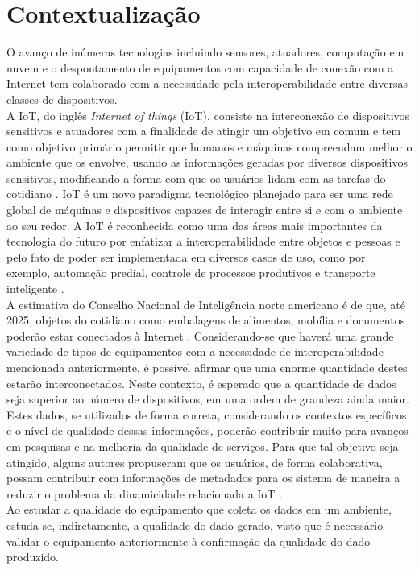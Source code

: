 \section{Contextualização}
\qquad
O avanço de inúmeras tecnologias incluindo sensores, atuadores, computação em nuvem e o despontamento de equipamentos com capacidade de conexão com a Internet tem colaborado com a necessidade pela interoperabilidade entre diversas classes de dispositivos.
\\ \null
\qquad
A \acrlong{IoT}, do inglês \textit{Internet of things} (\acrshort{IoT}), consiste na interconexão de dispositivos sensitivos e atuadores com a finalidade de atingir um objetivo em comum \cite{giusto} e tem como objetivo primário %
permitir que humanos e máquinas compreendam melhor o ambiente que os envolve, usando as informações geradas por
diversos dispositivos sensitivos, modificando a forma com que os usuários lidam com as tarefas do cotidiano \cite{IOTS}. \acrshort{IoT} é um novo paradigma tecnológico planejado para ser uma rede
global de máquinas e dispositivos capazes de interagir entre si e com o ambiente ao seu redor.
A \acrshort{IoT} é reconhecida como uma das áreas mais importantes da tecnologia do futuro por enfatizar a interoperabilidade entre objetos e pessoas e pelo fato de
poder ser implementada em diversos casos de uso, como por exemplo, automação predial, controle de processos produtivos e transporte inteligente \cite{IOTV}.
\\ \null
\qquad A estimativa do Conselho Nacional de Inteligência norte americano é de que, até 2025, objetos do cotidiano como embalagens de alimentos, mobília e documentos
poderão estar conectados à Internet \cite{intelsix}. Considerando-se que haverá uma grande variedade de tipos de equipamentos com a necessidade de interoperabilidade mencionada anteriormente,
é possível afirmar que uma enorme quantidade destes estarão interconectados. Neste contexto,
é esperado que a quantidade de dados seja superior ao número de dispositivos, em uma ordem de grandeza ainda maior.
\\ \null
\qquad Estes dados, se utilizados de forma correta, considerando os contextos específicos e o nível de qualidade dessas informações, poderão contribuir muito para avanços em pesquisas e na melhoria da qualidade de serviços. Para que tal objetivo seja atingido, alguns autores propuseram que os usuários, de forma colaborativa, possam contribuir com informações de metadados para os sistema de maneira a reduzir o problema da dinamicidade relacionada a \acrshort{IoT} \cite{collaborative}.
\\ \null \qquad Ao estudar a qualidade do equipamento que coleta os dados em um ambiente, estuda-se, indiretamente, a qualidade do dado gerado, visto que é necessário validar o equipamento anteriormente à confirmação da qualidade do dado produzido.
